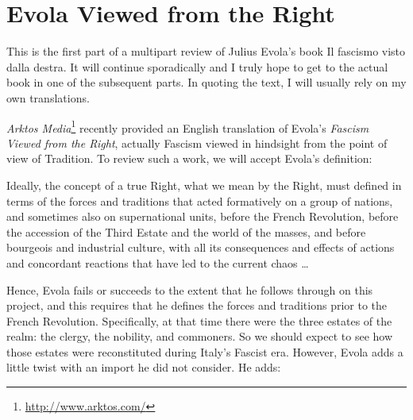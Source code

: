 \section{Evola Viewed from the Right}

\begin{quotex}
This is the first part of a multipart review of Julius Evola's book Il fascismo visto dalla destra. It will continue sporadically and I truly hope to get to the actual book in one of the subsequent parts. In quoting the text, I will usually rely on my own translations. 

\end{quotex}

\textit{Arktos Media}\footnote{\url{http://www.arktos.com/}} recently provided an English translation of Evola's \textit{Fascism Viewed from the Right}, actually Fascism viewed in hindsight from the point of view of Tradition. To review such a work, we will accept Evola's definition:

\begin{quotex}
Ideally, the concept of a true Right, what we mean by the Right, must defined in terms of the forces and traditions that acted formatively on a group of nations, and sometimes also on supernational units, before the French Revolution, before the accession of the Third Estate and the world of the masses, and before bourgeois and industrial culture, with all its consequences and effects of actions and concordant reactions that have led to the current chaos … 

\end{quotex}
Hence, Evola fails or succeeds to the extent that he follows through on this project, and this requires that he defines the forces and traditions prior to the French Revolution. Specifically, at that time there were the three estates of the realm: the clergy, the nobility, and commoners. So we should expect to see how those estates were reconstituted during Italy's Fascist era. However, Evola adds a little twist with an import he did not consider. He adds:


